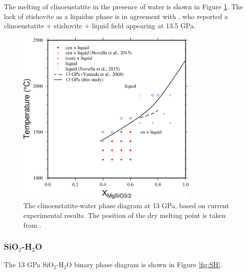 \documentclass[review]{elsarticle}
\begin{document}
The melting of clinoenstatite in the presence of water is shown in Figure \ref{fig:eoH}. The lack of stishovite as a liquidus phase is in agreement with \cite{YII2004}, who reported a clinoenstatite + stishovite + liquid field appearing at 13.5 GPa. 
\begin{figure}[ht!]
  \centering
      \includegraphics[width=0.8\textwidth]{figures/en-H2O}
  \caption{The clinoenstatite-water phase diagram at 13 GPa, based on current experimental results. The position of the dry melting point is taken from \cite{PG1990}.}
  \label{fig:eoH}
\end{figure}

\clearpage
\subsubsection{SiO$_2$-H$_2$O}
The 13 GPa SiO$_2$-H$_2$O binary phase diagram is shown in Figure \ref{fig:SH}. 


\end{document}

